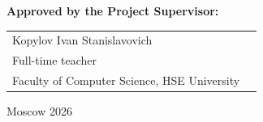 \begin{titlepage}
\vspace{1em}
{\bf Approved by the Project Supervisor: \vspace{2mm}}

{
\begin{tabular}{l@{\hskip 1.5cm}l}
Kopylov Ivan Stanislavovich\\
Full-time teacher\\
Faculty of Computer Science, HSE University 
\end{tabular}}

\vspace{\fill}

\begin{center}
Moscow 2026
\end{center}

\end{titlepage}